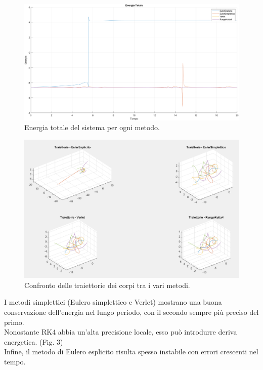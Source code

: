 \documentclass[a4paper,12pt]{article}
\begin{document}
\begin{figure}[H]
    \centering
    \includegraphics[width=1\textwidth]{energy_plot.png}
    \caption{Energia totale del sistema per ogni metodo.}
\end{figure}

\begin{figure}[H]
    \centering
    \includegraphics[width=1\textwidth]{trajectories_comparison.png}
    \caption{Confronto delle traiettorie dei corpi tra i vari metodi.}
\end{figure}

I metodi simplettici (Eulero simplettico e Verlet) mostrano una buona conservazione dell'energia nel lungo periodo, con il secondo sempre più preciso del primo. 
\\ Nonostante RK4 abbia un'alta precisione locale, esso pu\`o introdurre deriva energetica. (Fig. 3)\\ Infine, il metodo di Eulero esplicito risulta spesso instabile con errori crescenti nel tempo.
\end{document}
